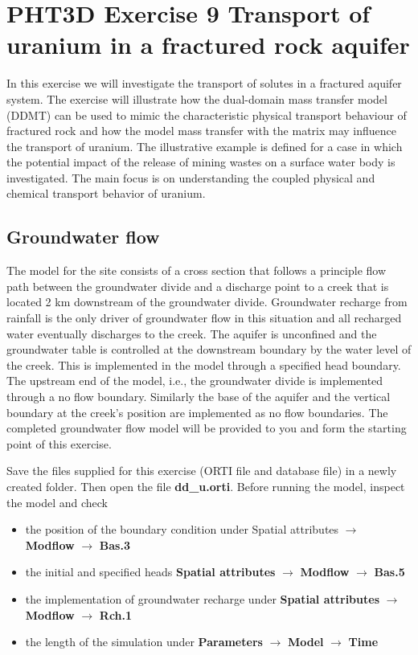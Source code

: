\section[PHT3D Exercise 9 Transport of uranium in a fractured rock aquifer]{PHT3D Exercise 9 Transport of uranium in a fractured rock aquifer}

In this exercise we will investigate the transport of solutes 
in a fractured aquifer system. The exercise will illustrate 
how the dual-domain mass transfer model (DDMT) can be used to mimic the
characteristic physical transport behaviour of fractured rock
and how the model mass transfer with the matrix may influence 
the transport of uranium. The illustrative example
is defined for a case in which the potential impact of 
the release of mining wastes on a surface water body 
is investigated. The main focus is on understanding the 
coupled physical and chemical transport behavior of uranium.        

\subsection{Groundwater flow}

The model for the site consists of a cross section that follows 
a principle flow path between the groundwater divide and 
a discharge point to a creek that is located 2 km downstream of the 
groundwater divide. Groundwater recharge from rainfall is the only 
driver of groundwater flow in this situation and all recharged 
water eventually discharges to the creek. 
The aquifer is unconfined and the groundwater table 
is controlled at the downstream boundary by the water level of the creek.
This is implemented in the model through a specified head boundary. 
The upstream end of the model, i.e., the groundwater divide is implemented
through a no flow boundary. Similarly the base of the aquifer and the
vertical boundary at the creek's position are implemented 
as no flow boundaries. The completed groundwater flow model 
will be provided to you and form the starting point of this exercise.

Save the files supplied for this exercise 
(ORTI file and database file) in a newly created 
folder. Then open the file  {\color{red}\textbf{dd\_u.orti}}.
Before running the model, inspect the model and check
\begin{itemize}
\item the position of the boundary condition under 
{\color{blue}Spatial attributes} 
$\rightarrow$ {\color{blue}\textbf{Modflow}} 
$\rightarrow$ {\color{blue}\textbf{Bas.3}}
\item the initial and specified heads 
{\color{blue}\textbf{Spatial attributes}} 
$\rightarrow$ {\color{blue}\textbf{Modflow}} 
$\rightarrow$  {\color{blue}\textbf{Bas.5}}
\item the implementation of groundwater recharge under 
{\color{blue}\textbf{Spatial attributes}} 
$\rightarrow$ {\color{blue}\textbf{Modflow}} 
$\rightarrow$ {\color{blue}\textbf{Rch.1}}
\item the length of the simulation under 
{\color{blue}\textbf{Parameters}} 
$\rightarrow$ {\color{blue}\textbf{Model}}
$\rightarrow$ {\color{blue}\textbf{Time}}
\end{itemize}


